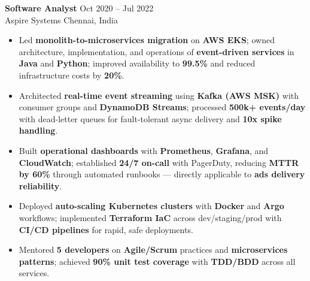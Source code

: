 \documentclass[letterpaper,10pt]{article}
\newcommand{\resumeItem}[1]{\item\small #1}
\newcommand{\resumeSubheading}[4]{
  \vspace{6pt}
  \noindent
  \textbf{#1} \hfill {\footnotesize #2} \\
  [-1pt]
  \noindent
  \small #3 \hfill {\small #4}
  \vspace{3pt}
}
\newcommand{\resumeItemsStart}{\vspace{-2pt}\begin{itemize}}
\newcommand{\resumeItemsEnd}{\end{itemize}\vspace{6pt}}
\begin{document}
\resumeSubheading
{Software Analyst}{Oct 2020 -- Jul 2022}
{Aspire Systems}{Chennai, India}
\resumeItemsStart
\resumeItem{Led \textbf{monolith-to-microservices migration} on \textbf{AWS EKS}; owned architecture, implementation, and operations of \textbf{event-driven services} in \textbf{Java} and \textbf{Python}; improved availability to \textbf{99.5\%} and reduced infrastructure costs by \textbf{20\%}.}
\resumeItem{Architected \textbf{real-time event streaming} using \textbf{Kafka (AWS MSK)} with consumer groups and \textbf{DynamoDB Streams}; processed \textbf{500k+ events/day} with dead-letter queues for fault-tolerant async delivery and \textbf{10x spike handling}.}
\resumeItem{Built \textbf{operational dashboards} with \textbf{Prometheus}, \textbf{Grafana}, and \textbf{CloudWatch}; established \textbf{24/7 on-call} with PagerDuty, reducing \textbf{MTTR by 60\%} through automated runbooks --- directly applicable to \textbf{ads delivery reliability}.}
\resumeItem{Deployed \textbf{auto-scaling Kubernetes clusters} with \textbf{Docker} and \textbf{Argo} workflows; implemented \textbf{Terraform IaC} across dev/staging/prod with \textbf{CI/CD pipelines} for rapid, safe deployments.}
\resumeItem{Mentored \textbf{5 developers} on \textbf{Agile/Scrum} practices and \textbf{microservices patterns}; achieved \textbf{90\% unit test coverage} with \textbf{TDD/BDD} across all services.}
\resumeItemsEnd
\vspace{-6pt}

\end{document}
